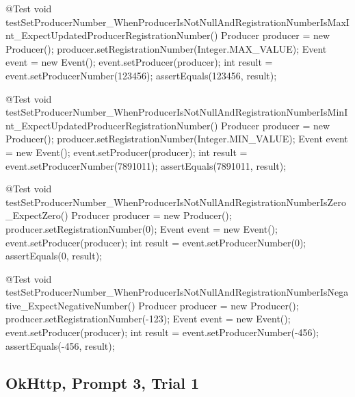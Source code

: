 \begin{response}
{  @Test
  void testSetProducerNumber_WhenProducerIsNotNullAndRegistrationNumberIsMaxInt_ExpectUpdatedProducerRegistrationNumber() {
      Producer producer = new Producer();
      producer.setRegistrationNumber(Integer.MAX_VALUE);
      Event event = new Event();
      event.setProducer(producer);
      int result = event.setProducerNumber(123456);
      assertEquals(123456, result);
  }

  @Test
  void testSetProducerNumber_WhenProducerIsNotNullAndRegistrationNumberIsMinInt_ExpectUpdatedProducerRegistrationNumber() {
      Producer producer = new Producer();
      producer.setRegistrationNumber(Integer.MIN_VALUE);
      Event event = new Event();
      event.setProducer(producer);
      int result = event.setProducerNumber(7891011);
      assertEquals(7891011, result);
  }

  @Test
  void testSetProducerNumber_WhenProducerIsNotNullAndRegistrationNumberIsZero_ExpectZero() {
      Producer producer = new Producer();
      producer.setRegistrationNumber(0);
      Event event = new Event();
      event.setProducer(producer);
      int result = event.setProducerNumber(0);
      assertEquals(0, result);
  }

  @Test
  void testSetProducerNumber_WhenProducerIsNotNullAndRegistrationNumberIsNegative_ExpectNegativeNumber() {
      Producer producer = new Producer();
      producer.setRegistrationNumber(-123);
      Event event = new Event();
      event.setProducer(producer);
      int result = event.setProducerNumber(-456);
      assertEquals(-456, result);
  }
}
\end{response}

\subsection{OkHttp, Prompt 3, Trial 1}

